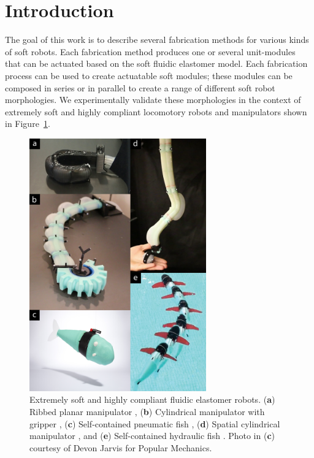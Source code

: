 
\section{Introduction}
\label{sec:Introduction}
The goal of this work is to describe several fabrication methods for various kinds of soft robots.
Each fabrication method produces one or several unit-modules that can be actuated based on the soft fluidic elastomer model.
Each fabrication process can be used to create actuatable soft modules; these modules can be composed in series or in parallel to create a range of different soft robot morphologies.
%
We experimentally validate these morphologies in the context of extremely soft and highly compliant locomotory robots and manipulators shown in Figure~\ref{fig:intro_new}.

\begin{figure}[!t]
  \centering
  \includegraphics[width=3in]{figures/introduction/intronew_v2.jpg}
  \caption{Extremely soft and highly compliant fluidic elastomer robots. (\textbf{a}) Ribbed planar manipulator \citep{marchese2014design}, (\textbf{b}) Cylindrical manipulator with gripper \citep{katzschmann2015autonomous}, (\textbf{c}) Self-contained pneumatic fish \citep{marchese2014autonomous}, (\textbf{d}) Spatial cylindrical manipulator \citep{marchese2015design}, and (\textbf{e}) Self-contained hydraulic fish \citep{katzschmann2014hydraulic}. Photo in (\textbf{c}) courtesy of Devon Jarvis for Popular Mechanics.}\label{fig:intro_new}
\end{figure}

